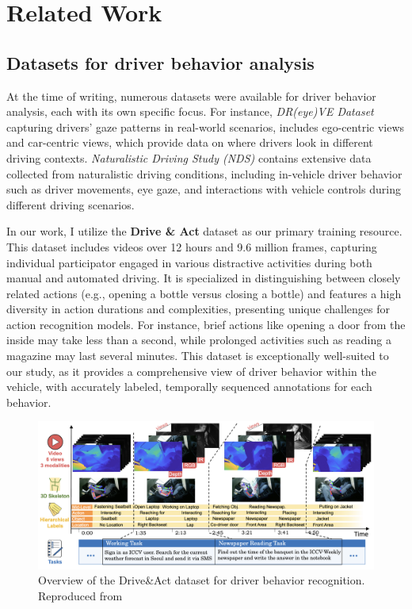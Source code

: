 \chapter{Related Work}\label{chapter:relatedwork}

\section{Datasets for driver behavior analysis}

At the time of writing, numerous datasets were available for driver behavior analysis, each with its own specific focus. For instance, \textit{DR(eye)VE Dataset}\cite{palazzi2018predicting} capturing drivers' gaze patterns in real-world scenarios, includes ego-centric views and car-centric views, which provide data on where drivers look in different driving contexts. \textit{Naturalistic Driving Study (NDS)}\cite{regan2012naturalistic} contains extensive data collected from naturalistic driving conditions, including in-vehicle driver behavior such as driver movements, eye gaze, and interactions with vehicle controls during different driving scenarios.


In our work, I utilize the \textbf{Drive \& Act} dataset\cite{9009583} as our primary training resource. This dataset includes videos over 12 hours and 9.6 million frames, capturing individual participator engaged in various distractive activities during both manual and automated driving. It is specialized in distinguishing between closely related actions (e.g., opening a bottle versus closing a bottle) and features a high diversity in action durations and complexities, presenting unique challenges for action recognition models. For instance, brief actions like opening a door from the inside may take less than a second, while prolonged activities such as reading a magazine may last several minutes. This dataset is exceptionally well-suited to our study, as it provides a comprehensive view of driver behavior within the vehicle, with accurately labeled, temporally sequenced annotations for each behavior.


\begin{figure}
    \centering
    \includegraphics[width=0.8\linewidth]{figures/03_DriveAct.png}
    \caption{Overview of the Drive\&Act dataset for driver behavior recognition. Reproduced from\cite{9009583}}
    \label{fig:DriveAct}
\end{figure}

